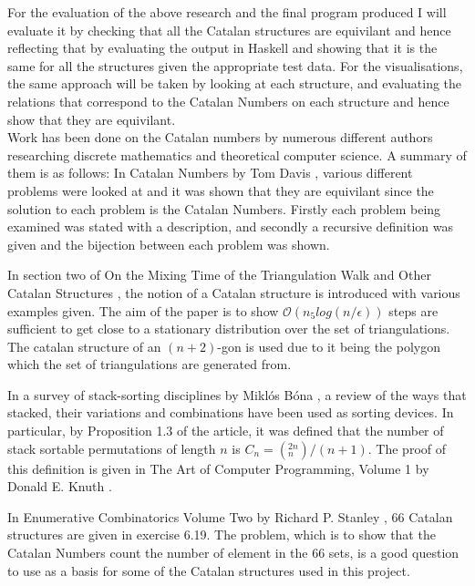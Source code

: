 \documentclass[10pt]{article}
\begin{document}
For the evaluation of the above research and the final program produced I will evaluate it by checking that all the Catalan structures are equivilant and hence reflecting that by evaluating the output in Haskell and showing that it is the same for all the structures given the appropriate test data. For the visualisations, the same approach will be taken by looking at each structure, and evaluating the relations that correspond to the Catalan Numbers on each structure and hence show that they are equivilant.\\

Work has been done on the Catalan numbers by numerous different authors researching discrete mathematics and theoretical computer science. A summary of them is as follows:
In Catalan Numbers by Tom Davis \cite{DavisCNum}, various different problems were looked at and it was shown that they are equivilant since the solution to each problem is the Catalan Numbers. Firstly each problem being examined was stated with a description, and secondly a recursive definition was given and the bijection between each problem was shown. 

In section two of On the Mixing Time of the Triangulation Walk and Other Catalan Structures \cite{McShine_onThe}, the notion of a Catalan structure is introduced with various examples given. The aim of the paper is to show $\mathcal{O}(n_{5}log(n/\epsilon))$ steps are sufficient to get close to a stationary distribution over the set of triangulations. The catalan structure of an $(n+2)$-gon is used due to it being the polygon which the set of triangulations are generated from.

In a survey of stack-sorting disciplines by Mikl\'{o}s B\'{o}na \cite{BonaStackSort}, a review of the ways that stacked, their variations and combinations have been used as sorting devices. In particular, by Proposition 1.3 of the article, it was defined that the number of stack sortable permutations of length $n$ is $C_{n} = (^{2n}_{n})/(n+1)$. The proof of this definition is given in The Art of Computer Programming, Volume 1 by Donald E. Knuth \cite{KnuthVol1}.

In Enumerative Combinatorics Volume Two by Richard P. Stanley \cite{StanleyEnum2}, 66 Catalan structures are given in exercise 6.19. The problem, which is to show that the Catalan Numbers count the number of element in the 66 sets, is a good question to use as a basis for some of the Catalan structures used in this project.\\
\end{document}
